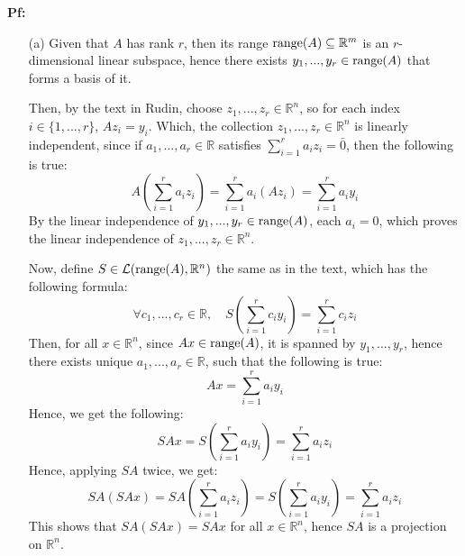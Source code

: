 \documentclass{article}
\begin{document}
\textbf{Pf:}
\begin{itemize}
    \item[(a)] Given that $A$ has rank $r$, then its range $\textmd{range}(A)\subseteq \mathbb{R}^m$ is an $r$-dimensional linear subspace, hence there exists $y_1,...,y_r\in \textmd{range}(A)$ that forms a basis of it.
    
    Then, by the text in Rudin, choose $z_1,...,z_r\in\mathbb{R}^n$, so for each index $i\in \{1,...,r\}$, $Az_i=y_i$. Which, the collection $z_1,...,z_r\in\mathbb{R}^n$ is linearly independent, since if $a_1,...,a_r\in\mathbb{R}$ satisfies $\sum_{i=1}^{r}a_iz_i = \bar{0}$, then the following is true:
    $$A\left(\sum_{i=1}^{r}a_iz_i\right) = \sum_{i=1}^{r}a_i(Az_i) = \sum_{i=1}^{r}a_iy_i$$
    By the linear independence of $y_1,...,y_r\in \textmd{range}(A)$, each $a_i = 0$, which proves the linear independence of $z_1,...,z_r\in\mathbb{R}^n$.

    \begin{comment}
    Now, we can expand the linearly independent list $z_1,...,z_r\in\mathbb{R}^n$ into a basis, say $z_1,...,z_r,x_1,...,x_k\in\mathbb{R}^n$ with $r+k=n$.
    Which, each $x_j$ with $j\in\{1,...,k\}$ must satisfy $Ax_j = \bar{0}\in\mathbb{R}^m$ (or $x_j\in \textmd{null}(A)\subseteq\mathbb{R}^n$): Since $Ax_j\in\textmd{range}(A)$, then it is spanned by $y_1,...,y_r$, there exists $a_1,...,a_r\in\mathbb{R}$ such that the following equation is true:
    $$Ax_j = \sum_{i=1}^{r}a_iy_i$$
    By the definition of $z_i$ given above, $Ax_j$ can then be rewrite as:
    $$Ax_j = \sum_{i=1}^{r}a_iy_i = \sum_{i=1}^{r}a_i(Az_i) = A\left(\sum_{i=1}^{r}a_iz_i\right)$$
    \end{comment}

    Now, define $S\in\mathcal{L}(\textmd{range}(A),\mathbb{R}^n)$ the same as in the text, which has the following formula:
    $$\forall c_1,...,c_r\in\mathbb{R},\quad S\left(\sum_{i=1}^{r}c_iy_i\right)=\sum_{i=1}^{r}c_iz_i$$
    Then, for all $x\in\mathbb{R}^n$, since $Ax\in\textmd{range}(A)$, it is spanned by $y_1,...,y_r$, hence there exists unique $a_1,...,a_r\in\mathbb{R}$, such that the following is true:
    $$Ax = \sum_{i=1}^{r}a_iy_i$$
    Hence, we get the following:
    $$SAx = S\left(\sum_{i=1}^{r}a_iy_i\right) = \sum_{i=1}^{r}a_iz_i$$
    Hence, applying $SA$ twice, we get:
    $$SA(SAx) = SA\left(\sum_{i=1}^{r}a_iz_i\right) = S\left(\sum_{i=1}^{r}a_iy_i\right) = \sum_{i=1}^{r}a_iz_i$$
    This shows that $SA(SAx) = SAx$ for all $x\in\mathbb{R}^n$, hence $SA$ is a projection on $\mathbb{R}^n$.


\end{itemize}
\end{document}
